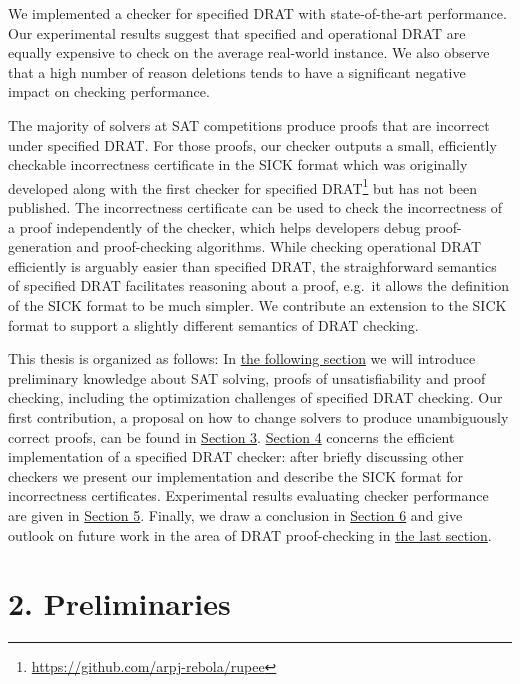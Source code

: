 \documentclass[
]{report}
\begin{document}
We implemented a checker for specified DRAT with state-of-the-art
performance. Our experimental results suggest that specified and
operational DRAT are equally expensive to check on the average
real-world instance. We also observe that a high number of reason
deletions tends to have a significant negative impact on checking
performance.

The majority of solvers at SAT competitions produce proofs that are
incorrect under specified DRAT. For those proofs, our checker outputs a
small, efficiently checkable incorrectness certificate in the SICK
format which was originally developed along with the first checker for
specified DRAT\footnote{\url{https://github.com/arpj-rebola/rupee}} but
has not been published. The incorrectness certificate can be used to
check the incorrectness of a proof independently of the checker, which
helps developers debug proof-generation and proof-checking algorithms.
While checking operational DRAT efficiently is arguably easier than
specified DRAT, the straighforward semantics of specified DRAT
facilitates reasoning about a proof, e.g.~it allows the definition of
the SICK format to be much simpler. We contribute an extension to the
SICK format to support a slightly different semantics of DRAT checking.

This thesis is organized as follows: In
\protect\hyperlink{preliminaries}{the following section} we will
introduce preliminary knowledge about SAT solving, proofs of
unsatisfiability and proof checking, including the optimization
challenges of specified DRAT checking. Our first contribution, a
proposal on how to change solvers to produce unambiguously correct
proofs, can be found in
\protect\hyperlink{drat-proofs-without-deletions-of-unique-reason-clauses}{Section
3}.
\protect\hyperlink{complete-and-efficient-drat-proof-checking}{Section
4} concerns the efficient implementation of a specified DRAT checker:
after briefly discussing other checkers we present our implementation
and describe the SICK format for incorrectness certificates.
Experimental results evaluating checker performance are given in
\protect\hyperlink{experimental-evaluation}{Section 5}. Finally, we draw
a conclusion in \protect\hyperlink{conclusion}{Section 6} and give
outlook on future work in the area of DRAT proof-checking in
\protect\hyperlink{future-work}{the last section}.

\hypertarget{preliminaries}{%
\chapter{2. Preliminaries}\label{preliminaries}}
\end{document}
